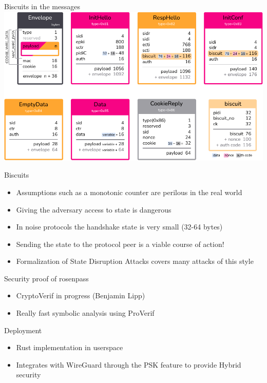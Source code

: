 \begin{frame}{Biscuits in the messages}
  \includegraphics[height=.80\textheight]{graphics/rosenpass-wp-message-types-rgb.pdf}
\end{frame}

\begin{frame}{Biscuits}
  \begin{itemize}
    \item Assumptions such as a monotonic counter are perilous in the real world
    \item Giving the adversary access to state is dangerous
    \item In noise protocols the handshake state is very small (32-64 bytes)
    \item Sending the state to the protocol peer is a viable course of action!
    \item Formalization of State Disruption Attacks covers many attacks of this style
  \end{itemize}
\end{frame}

\begin{frame}{Security proof of rosenpass}
  \begin{itemize}
    \item CryptoVerif in progress (Benjamin Lipp)
    \item Really fast symbolic analysis using ProVerif
  \end{itemize}
\end{frame}

\begin{frame}{Deployment}
  \begin{itemize}
    \item Rust implementation in userspace
    \item Integrates with WireGuard through the PSK feature to provide Hybrid security
  \end{itemize}
\end{frame}

